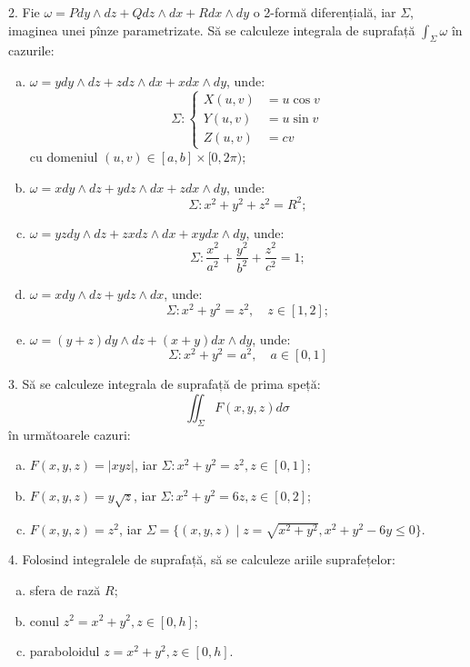 \documentclass[11pt,a4paper]{article}
\theoremstyle{dotless}
\theoremstyle{dotlessdr}
\begin{document}
2. Fie $\omega = Pdy \wedge dz + Qdz \wedge dx + Rdx \wedge dy$ o 2-formă diferențială,
iar $\Sigma$, imaginea unei pînze parametrizate. Să se calculeze integrala de
suprafață $\int_\Sigma \omega$ în cazurile:
\begin{enumerate}[(a)]
\item $\omega = ydy \wedge dz + zdz \wedge dx + xdx \wedge dy$, unde:
  \[
    \Sigma : \begin{cases}
      X(u, v) &= u \cos v \\
      Y(u, v) &= u \sin v \\
      Z(u, v) &= cv
    \end{cases}
  \]
  cu domeniul $(u, v) \in [a, b] \times [0, 2\pi)$;
\item $\omega = xdy \wedge dz + ydz \wedge dx + zdx \wedge dy$, unde:
  \[
    \Sigma : x^2 + y^2 + z^2 = R^2;
  \]
\item $\omega = yzdy \wedge dz + zxdz \wedge dx + xydx \wedge dy$, unde:
  \[
    \Sigma : \frac{x^2}{a^2} + \frac{y^2}{b^2} + \frac{z^2}{c^2} = 1;
  \]
\item $\omega = xdy \wedge dz + ydz \wedge dx$, unde:
  \[
    \Sigma: x^2 + y^2 = z^2, \quad z \in [1,2];
  \]
\item $\omega = (y + z) dy \wedge dz + (x + y) dx \wedge dy$, unde:
  \[
    \Sigma: x^2 + y^2 = a^2, \quad a \in [0, 1]
  \]
\end{enumerate}

\vspace{1cm}

3. Să se calculeze integrala de suprafață de prima speță:
\[
  \iint_\Sigma F(x, y, z) d\sigma
\]
în următoarele cazuri:
\begin{enumerate}[(a)]
\item $F(x, y, z) = |xyz|$, iar $\Sigma: x^2 + y^2 = z^2, z \in [0, 1]$;
\item $F(x, y, z) = y\sqrt{z}$, iar $\Sigma: x^2 + y^2 = 6z, z \in [0, 2]$;
\item $F(x, y, z) = z^2$, iar $\Sigma = \{(x, y, z) \mid z = \sqrt{x^2 + y^2}, %
  x^2 + y^2 - 6y \leq 0 \}$.
\end{enumerate}

\vspace{1cm}

4. Folosind integralele de suprafață, să se calculeze ariile suprafețelor:
\begin{enumerate}[(a)]
\item sfera de rază $R$;
\item conul $z^2 = x^2 + y^2, z \in [0, h]$;
\item paraboloidul $z = x^2 + y^2, z \in [0, h]$.
\end{enumerate}
\end{document}
